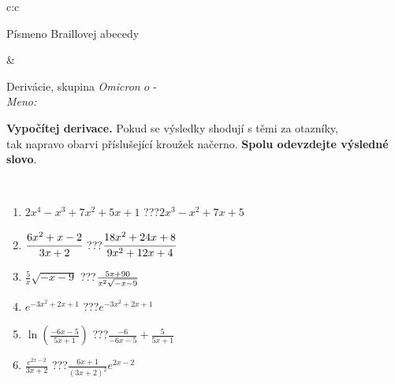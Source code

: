 \documentclass[10pt]{report}
\newcommand\omicron{o}
\begin{document}
\begin{tabular}{c:c}
\begin{minipage}[c][104.5mm][t]{0.5\linewidth}
\begin{center}
\begin{minipage}{0.20\linewidth}
\begin{center}
{\small Písmeno Braillovej abecedy}
\end{center}
\end{minipage}
\end{center}
\end{minipage}
&
\begin{minipage}[c][104.5mm][t]{0.5\linewidth}
\begin{center}
\vspace{7mm}
{\huge Derivácie, skupina \textit{Omicron $\omicron$} -}\\[5mm]
\textit{Meno:}\phantom{xxxxxxxxxxxxxxxxxxxxxxxxxxxxxxxxxxxxxxxxxxxxxxxxxxxxxxxxxxxxxxxxx}\\[5mm]
\begin{minipage}{0.95\linewidth}
\begin{center}
\textbf{Vypočítej derivace.} Pokud se výsledky shodují s těmi za otazníky,\\tak napravo obarvi příslušející kroužek načerno. \textbf{Spolu odevzdejte výsledné slovo}.
\end{center}
\end{minipage}
\\[1mm]
\begin{minipage}{0.79\linewidth}
\begin{center}
\begin{varwidth}{\linewidth}
\begin{enumerate}
\normalsize
\item $2x^4-x^3+7x^2+5x+1$\quad \dotfill\; ???\;\dotfill \quad $2x^3-x^2+7x+5$
\item $\cfrac{6x^2+x-2}{3x+2}$\quad \dotfill\; ???\;\dotfill \quad $\cfrac{18x^2+24x+8}{9x^2+12x+4}$
\item $\frac{5}{x}\sqrt{-x-9}$\quad \dotfill\; ???\;\dotfill \quad $\frac{5x+90}{x^2 \sqrt{\smash[b]{-x-9}}}$
\item $e^{-3x^2+2x+1}$\quad \dotfill\; ???\;\dotfill \quad $e^{-3x^2+2x+1}$
\item $\ln{\left(\frac{-6x-5}{5x+1}\right)}$\quad \dotfill\; ???\;\dotfill \quad $\frac{-6}{-6x-5}+\frac{5}{5x+1}$
\item $\frac{e^{2x-2}}{3x+2}$\quad \dotfill\; ???\;\dotfill \quad $\frac{6x+1}{(3x+2)^2}e^{2x-2}$
\end{enumerate}
\end{varwidth}
\end{center}
\end{minipage}
\begin{minipage}{0.20\linewidth}
\begin{center}

\end{center}
\end{minipage}
\end{center}
\end{minipage}
\end{tabular}
\end{document}
